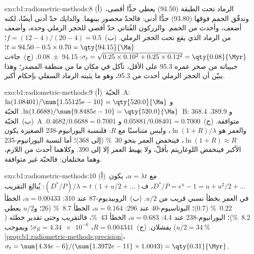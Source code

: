 \begin{solution}{exo:b1:radiometric-methods:8}
(أ)~الرماد تحت الطبقة (\qty{94.50}{\Ma}) يعطي حدًّا أقصى، وتدفّق الحمم فوقها (\qty{93.80}{\Ma}) حدًّا أدنى: فالحدّ محصور بينهما. والدايك حدّ أدنى أيضًا، لكنه أضعف، وأحدث من الحمم. والزركون الفُتاتي حدّ أقصى للحجر الرملي وحده، وأضعف من الرماد الذي يقع تحت الحجر الرملي. (ب)~$f = (12 - 4)/(20 - 4) = 0.5$؛ $t = 94.50 - 0.5 \times 0.70 =
\qty{94.15}{\Ma}$؛ $\sigma_t = \sqrt{0.25 \times 0.10^2 + 0.25 \times 0.12^2} =
\qty{0.08}{\Myr}$: \qty[uncertainty-mode=separate]{94.15(8)}{\Ma}. (ج)~جاءت حبيباته من صخر عمره \qty{95.3}{\Ma} على الأقل، تآكل في مكان ما من منطقة المصدر؛ وهذا يبيّن أن الحجر الرملي أحدث من \qty{95.3}{\Ma}، وهو ما يثبته الرماد السفلي بإحكام أكبر.
\end{solution}

\begin{solution}{exo:b1:radiometric-methods:9}
(أ)~الحبّة~A: $\ln(1.08401)/\num{1.55125e-10} = \qty{520.0}{\Ma}$ و
$\ln(1.6688)/\num{9.8485e-10} = \qty{520.0}{\Ma}$. الحبّة~B: \qty{368.4}{\Ma} و
\qty{389.9}{\Ma}. (ب)~الحبّة~A متوافقة. (ج)~$0.05881/0.08401 = 0.7000$ و
$0.4682/0.6688 = 0.7001$. والعمر هو $\ln(1 + R)/\lambda$، وليس متناسبًا مع
$R$: فلنسبة اليورانيوم-238 الصغيرة يكون $\ln(1+R) \approx R$، فينخفض العمر بنحو \qty{30}{\percent} (إلى \qty{368}{\Ma})؛ أما لنسبة اليورانيوم-235 الأكبر فينخفض اللوغاريتم بأقلّ، ولا يهبط العمر إلا إلى \qty{390}{\Ma}. وكلاهما أحدث من اللازم، وهما مختلفان: فالحبّة غير متوافقة.
\end{solution}

\begin{solution}{exo:b1:radiometric-methods:10}
(أ)~مع $u = \lambda t$، يكون $D^*/P = e^u - 1 = u + u^2/2 + \dots$، ف$(D^*/P)/\lambda
= t\,(1 + u/2 + \dots)$: يُبالغ التقريب في العمر بخطأ نسبي قريب من $u/2$. (ب)~الروبيديوم-87 عند \qty{310}{\Ma}: $u = 0.00433$، الخطأ
\qty{0.22}{\percent} (\qty{0.7}{\Myr})؛ البوتاسيوم-40 عند \qty{296}{\Ma}: $u =
0.164$، الخطأ \qty{8.7}{\percent} (\qty{26}{\Myr}؛ و$u/2$ يعطي \qty{8.2}{\percent})؛
اليورانيوم-238 عند \qty{4.4}{\Ga}: $u = 0.683$، الخطأ \qty{43}{\percent}، فالتقريب وحتى تقدير خطئه ($u/2 = \qty{34}{\percent}$) يفشلان. (ج)~$R = 0.004341$، $\sigma_R = \num{4.34e-6}$؛ وبموجب
\cref{prop:b1:radiometric-methods:precision}، $\sigma_t =
\num{4.34e-6}/(\num{1.3972e-11} \times 1.0043) = \qty{0.31}{\Myr}$.
\end{solution}

